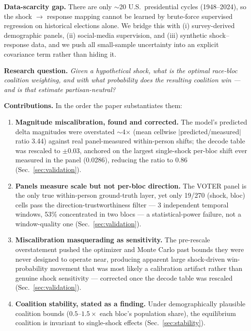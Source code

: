 \documentclass[11pt]{article}
\begin{document}
\textbf{Data-scarcity gap.} There are only $\sim$20 U.S.\ presidential cycles
(1948--2024), so the shock $\rightarrow$ response mapping cannot be learned by
brute-force supervised regression on historical elections alone. We bridge this
with (i) survey-derived demographic panels, (ii) social-media supervision, and
(iii) synthetic shock--response data, and we push all small-sample uncertainty
into an explicit covariance term rather than hiding it.

\textbf{Research question.} \emph{Given a hypothetical shock, what is the optimal
race-bloc coalition weighting, and with what probability does the resulting
coalition win --- and is that estimate partisan-neutral?}

\textbf{Contributions.} In the order the paper substantiates them:
\begin{enumerate}
  \item \textbf{Magnitude miscalibration, found and corrected.} The model's
        predicted delta magnitudes were overstated $\sim$4$\times$ (mean
        cellwise $|$predicted/measured$|$ ratio 3.44) against real
        panel-measured within-person shifts; the decode table was rescaled to
        $\pm0.03$, anchored on the largest single-shock per-bloc shift ever
        measured in the panel (0.0286), reducing the ratio to 0.86
        (Sec.~\ref{sec:validation}).
  \item \textbf{Panels measure scale but not per-bloc direction.} The VOTER
        panel is the only true within-person ground-truth layer, yet only
        19/270 (shock, bloc) cells pass the direction-trustworthiness filter
        --- 3 independent temporal windows, 53\% concentrated in two blocs ---
        a statistical-power failure, not a window-quality one
        (Sec.~\ref{sec:validation}).
  \item \textbf{Miscalibration masquerading as sensitivity.} The pre-rescale
        overstatement pushed the optimizer and Monte Carlo past bounds they
        were never designed to operate near, producing apparent large
        shock-driven win-probability movement that was most likely a
        calibration artifact rather than genuine shock sensitivity ---
        corrected once the decode table was rescaled (Sec.~\ref{sec:validation}).
  \item \textbf{Coalition stability, stated as a finding.} Under
        demographically plausible coalition bounds ($0.5$--$1.5\times$ each
        bloc's population share), the equilibrium coalition is invariant to
        single-shock effects (Sec.~\ref{sec:stability}).

\end{enumerate}
\end{document}
